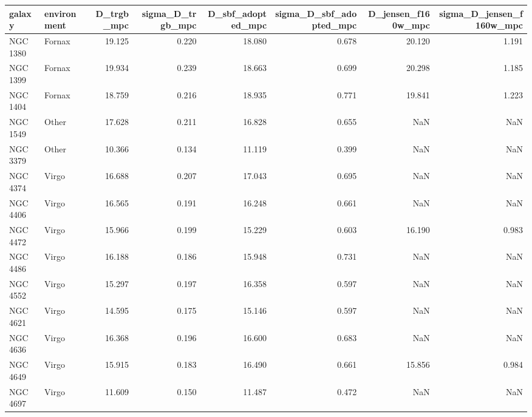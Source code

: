 \begin{tabular}{llrrrrrr}
\toprule
galaxy & environment & D_trgb_mpc & sigma_D_trgb_mpc & D_sbf_adopted_mpc & sigma_D_sbf_adopted_mpc & D_jensen_f160w_mpc & sigma_D_jensen_f160w_mpc \\
\midrule
NGC 1380 & Fornax & 19.125 & 0.220 & 18.080 & 0.678 & 20.120 & 1.191 \\
NGC 1399 & Fornax & 19.934 & 0.239 & 18.663 & 0.699 & 20.298 & 1.185 \\
NGC 1404 & Fornax & 18.759 & 0.216 & 18.935 & 0.771 & 19.841 & 1.223 \\
NGC 1549 & Other & 17.628 & 0.211 & 16.828 & 0.655 & NaN & NaN \\
NGC 3379 & Other & 10.366 & 0.134 & 11.119 & 0.399 & NaN & NaN \\
NGC 4374 & Virgo & 16.688 & 0.207 & 17.043 & 0.695 & NaN & NaN \\
NGC 4406 & Virgo & 16.565 & 0.191 & 16.248 & 0.661 & NaN & NaN \\
NGC 4472 & Virgo & 15.966 & 0.199 & 15.229 & 0.603 & 16.190 & 0.983 \\
NGC 4486 & Virgo & 16.188 & 0.186 & 15.948 & 0.731 & NaN & NaN \\
NGC 4552 & Virgo & 15.297 & 0.197 & 16.358 & 0.597 & NaN & NaN \\
NGC 4621 & Virgo & 14.595 & 0.175 & 15.146 & 0.597 & NaN & NaN \\
NGC 4636 & Virgo & 16.368 & 0.196 & 16.600 & 0.683 & NaN & NaN \\
NGC 4649 & Virgo & 15.915 & 0.183 & 16.490 & 0.661 & 15.856 & 0.984 \\
NGC 4697 & Virgo & 11.609 & 0.150 & 11.487 & 0.472 & NaN & NaN \\
\bottomrule
\end{tabular}
